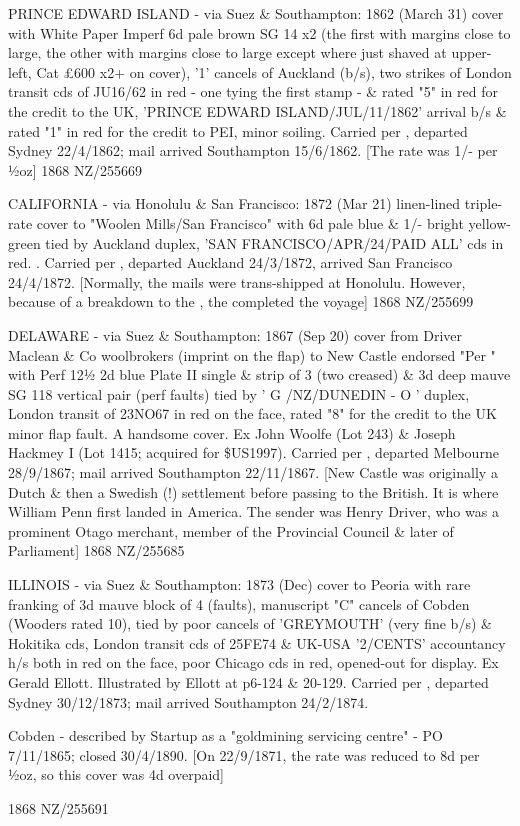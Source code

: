 \documentclass[justified]{tufte-book}
\begin{document}
%
{PRINCE EDWARD ISLAND - via Suez \& Southampton: 1862 (March 31) cover with White Paper Imperf 6d pale brown SG 14 x2 (the first with margins close to large, the other with margins close to large except where just shaved at upper-left, Cat £600 x2+ on cover), '1' cancels of Auckland (b/s), two strikes of London transit cds of JU16/62 in red - one tying the first stamp - \& rated "5" in red for the credit to the UK, 'PRINCE EDWARD ISLAND/JUL/11/1862' arrival b/s \& rated "1" in red for the credit to PEI, minor soiling. Carried per , departed Sydney 22/4/1862; mail arrived Southampton 15/6/1862. [The rate was 1/- per ½oz]}%
{1868}%
{NZ/255669}%
{}%
{}
{}%
{}

%
{CALIFORNIA - via Honolulu \& San Francisco: 1872 (Mar 21) linen-lined triple-rate cover to "Woolen Mills/San Francisco" with 6d pale blue \& 1/- bright yellow-green tied by Auckland duplex, 'SAN FRANCISCO/APR/24/PAID ALL' cds in red. . Carried per , departed Auckland 24/3/1872, arrived San Francisco 24/4/1872. [Normally, the mails were trans-shipped at Honolulu. However, because of a breakdown to the , the  completed the voyage]}%
{1868}%
{NZ/255699}%
{}%
{}
{}%
{}

%
{DELAWARE - via Suez \& Southampton: 1867 (Sep 20) cover from Driver Maclean \& Co woolbrokers (imprint on the flap) to New Castle endorsed "Per " with Perf 12½ 2d blue Plate II single \& strip of 3 (two creased) \& 3d deep mauve SG 118 vertical pair (perf faults) tied by ' G /NZ/DUNEDIN - O ' duplex, London transit of 23NO67 in red on the face, rated "8" for the credit to the UK minor flap fault. A handsome cover. Ex John Woolfe (Lot 243) \& Joseph Hackmey I (Lot 1415; acquired for \$US1997). Carried per , departed Melbourne 28/9/1867; mail arrived Southampton 22/11/1867. [New Castle was originally a Dutch \& then a Swedish (!) settlement before passing to the British. It is where William Penn first landed in America. The sender was Henry Driver, who was a prominent Otago merchant, member of the Provincial Council \& later of Parliament]}%
{1868}%
{NZ/255685}%
{}%
{}
{}%
{}


%
{ILLINOIS - via Suez \& Southampton: 1873 (Dec) cover to Peoria with rare franking of 3d mauve block of 4 (faults), manuscript "C" cancels of Cobden (Wooders rated 10), tied by poor cancels of 'GREYMOUTH' (very fine b/s) \& Hokitika cds, London transit cds of 25FE74 \& UK-USA '2/CENTS' accountancy h/s both in red on the face, poor Chicago cds in red, opened-out for display. Ex Gerald Ellott. Illustrated by Ellott at p6-124 \& 20-129. Carried per , departed Sydney 30/12/1873; mail arrived Southampton 24/2/1874. 

Cobden - described by Startup as a "goldmining servicing centre" - PO 7/11/1865; closed 30/4/1890. [On 22/9/1871, the rate was reduced to 8d per ½oz, so this cover was 4d overpaid]}%
{1868}%
{NZ/255691}%
{}%
{}
{}%
{}
\end{document}
